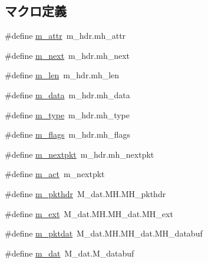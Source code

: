 \subsection*{マクロ定義}
\begin{DoxyCompactItemize}
\item 
\#define \hyperlink{mbuf_8hh_acd1b346488dae3e5c08d3de76513b798}{m\_\-attr}~m\_\-hdr.mh\_\-attr
\item 
\#define \hyperlink{mbuf_8hh_a9def56bacea65366a0c3047abee0022b}{m\_\-next}~m\_\-hdr.mh\_\-next
\item 
\#define \hyperlink{mbuf_8hh_aa1fcd27b1ef71b502acf03511fb32774}{m\_\-len}~m\_\-hdr.mh\_\-len
\item 
\#define \hyperlink{mbuf_8hh_a96f3766a8c0c04b88e62da8cf59c09a8}{m\_\-data}~m\_\-hdr.mh\_\-data
\item 
\#define \hyperlink{mbuf_8hh_aa85d63af1da9cfc5a9c7b9f7e29dfb41}{m\_\-type}~m\_\-hdr.mh\_\-type
\item 
\#define \hyperlink{mbuf_8hh_abae9862c92061cacb9113955f2dd4f2d}{m\_\-flags}~m\_\-hdr.mh\_\-flags
\item 
\#define \hyperlink{mbuf_8hh_a3be154745693129279eb8cf2ae1b0551}{m\_\-nextpkt}~m\_\-hdr.mh\_\-nextpkt
\item 
\#define \hyperlink{mbuf_8hh_a52a8aa0f017072e61f2239e164dba2f6}{m\_\-act}~m\_\-nextpkt
\item 
\#define \hyperlink{mbuf_8hh_a278695b91f18d93ecd23a815f54e617d}{m\_\-pkthdr}~M\_\-dat.MH.MH\_\-pkthdr
\item 
\#define \hyperlink{mbuf_8hh_a081c07d4d893e57feab4f91ae02337e1}{m\_\-ext}~M\_\-dat.MH.MH\_\-dat.MH\_\-ext
\item 
\#define \hyperlink{mbuf_8hh_aef5936fb48f5f6194b8fb0c24eacf629}{m\_\-pktdat}~M\_\-dat.MH.MH\_\-dat.MH\_\-databuf
\item 
\#define \hyperlink{mbuf_8hh_a2f5543cd861f88009b1ad07538953667}{m\_\-dat}~M\_\-dat.M\_\-databuf
\end{DoxyCompactItemize}


